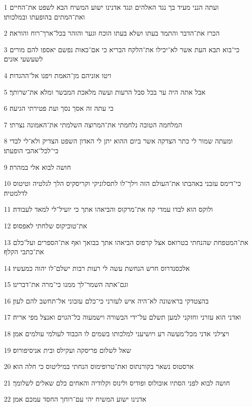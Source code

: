\par 1 ועתה הנני מעיד בך נגד האלהים ונגד אדנינו ישוע המשיח הבא לשפט את־החיים ואת־המתים בהופעתו ובמלכותו׃
\par 2 הכרז את־הדבר והתמד בעתו ושלא בעתו הוכח וגער והזהר בכל־ארך־רוח והוראה׃
\par 3 כי־בוא תבא העת אשר לא־יכילו את־הלקח הבריא כי אם־כאות נפשם יאספו להם מורים לשעשעי אזנים׃
\par 4 ויטו אזניהם מן־האמת ויפנו אל־ההגדות׃
\par 5 אבל אתה היה ער בכל סבל הרעות ועשה מלאכת המבשר ומלא את־שרותך׃
\par 6 כי עתה זה אסך נסך ועת פטירתי הגיעה׃
\par 7 המלחמה הטובה נלחמתי את־המרוצה השלמתי את־האמונה נצרתי׃
\par 8 ומעתה שמור לי כתר הצדקה אשר ביום ההוא יתן לי האדון השפט הצדיק ולא־לי לבדי כי־לכל־אהבי הופעתו׃
\par 9 חושה לבוא אלי במהרה׃
\par 10 כי־דימס עזבני באהבתו את־העולם הזה וילך־לו לתסלוניקי וקריסקיס הלך לגלטיה וטיטוס לדלמטיה׃
\par 11 ולוקס הוא לבדו עמדי קח את־מרקוס והביאהו אתך כי יועיל־לי למאד לעבודה׃
\par 12 את־טוכיקוס שלחתי לאפסוס׃
\par 13 את־המטפחת שהנחתי בטרואס אצל קרפוס הביאהו אתך בבואך ואף את־הספרים ועל־כלם את־כתבי הקלף׃
\par 14 אלכסנדרוס חרש הנחשת עשה לי רעות רבות ישלם־לו יהוה כמעשיו׃
\par 15 וגם־אתה השמר־לך ממנו כי־מרה את־דברינו׃
\par 16 בהצטדקי בראשונה לא־היה איש לעזרני כי־כלם עזבוני אל־תחשב להם לעון׃
\par 17 ואדני הוא עזרני וחזקני למען תשלם על־ידי הבשורה וישמעוה כל־הגוים ואנצל מפי אריה׃
\par 18 ויצילני אדני מכל־מעשה רע ויושיעני למלכותו בשמים לו הכבוד לעולמי עולמים אמן׃
\par 19 שאל לשלום פריסקה ועקילס ובית אניסיפורוס׃
\par 20 ארסטוס נשאר בקורנתוס ואת־טרופימוס הנחתי במיליטוס כי חלה הוא׃
\par 21 חושה לבוא לפני הסתיו אובולוס ופודיס ולינוס וקלודיה והאחים כלם שאלים לשלומך׃
\par 22 אדנינו ישוע המשיח יהי עם־רוחך החסד עמכם אמן׃


